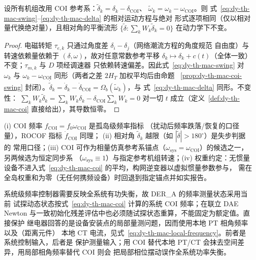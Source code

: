 \begin{proposition}[参考系平移不变性]\label{prop:dy-th-mac-shift}
设所有机组改用 COI 参考系：$\tilde\delta_k=\delta_k-\delta_{\mathrm{COI}}$、
$\tilde\omega_k=\omega_k-\omega_{\mathrm{COI}}$。则
式~\eqref{eq:dy-th-mac-swing}--\eqref{eq:dy-th-mac-delta} 的相对运动方程与绝对
形式逐项相同（仅以相对量代换绝对量），且相对角的平衡流形
$\{\tilde\delta:\sum_kW_k\tilde\delta_k=0\}$ 在动力学下不变。
\end{proposition}

\begin{proof}
电磁转矩 $\tau_{e,k}$ 只通过角度差 $\delta_i-\delta_j$（网络潮流方程的角度规范
自由度）与转速依赖量依赖于 $(\delta,\omega)$，故对任意常数参考平移
$\delta_k\mapsto\delta_k+c(t)$（全体一致）不变；$\tau_{m,k}$ 与 $D$ 项经调速器
只依赖转速偏差。因此式~\eqref{eq:dy-th-mac-swing} 对 $\omega_k$ 与
$\omega_k-\omega_{\mathrm{COI}}$ 同形（两者之差 $2H_T$ 加权平均后由命题
~\ref{prop:dy-th-mac-coi-swing} 封闭）。$\dot{\tilde\delta}_k
=\dot\delta_k-\dot\delta_{\mathrm{COI}}=\Omega_b(\tilde\omega_k)$，与
式~\eqref{eq:dy-th-mac-delta} 同形。不变性：
$\sum_kW_k\tilde\delta_k=\sum_kW_k\delta_k-\delta_{\mathrm{COI}}\sum_kW_k=0$
对一切 $t$ 成立（定义~\ref{def:dy-th-mac-coi} 直接给出），其导数恒零。
\end{proof}

\begin{remark}\label{rem:dy-th-mac-coi-use}
(i) COI 频率 $f_{\mathrm{COI}}=f_0\omega_{\mathrm{COI}}$ 是孤岛级频率指标
（扰动后频率跌落/恢复的口径量），ROCOF 指标 $\dot f_{\mathrm{COI}}$ 同理；
(ii) 相对角 $\tilde\delta_k$ 越限（如 $|\tilde\delta|>180^\circ$）是失步判据的
常用口径；(iii) COI 可作为相量仿真参考系锚点（$\omega_{\mathrm{sys}}=
\omega_{\mathrm{COI}}$）的候选之一，另两候选为恒定同步系
（$\omega_{\mathrm{sys}}\equiv1$）与指定参考机组转速；(iv) 权重约定：无惯量
设备不进入式~\eqref{eq:dy-th-mac-coi} 的平均，构网逆变器以虚拟惯量参数参与，
需在全岛权重和为零（无任何携频设备）时回退到指定锚点并如实报告。
\end{remark}

\begin{remark}[系统控制频率与本地保护频率不可混用]\label{rem:dy-th-mac-frequency-semantics}
系统级频率控制器需要反映全系统有功失衡，故 DER\_A 的频率测量状态采用当前
试探动态状态按式~\eqref{eq:dy-th-mac-coi} 计算的系统 COI 频率；在联立 DAE
Newton 与一致初始化残差评估中也必须随试探状态重算，不能固定为额定值。直接保护
继电器回答的是设备安装点的局部量测问题，因而使用本地 PT 相角频率以及（距离元件）
本地 CT 电流，见式~\eqref{eq:dy-th-mac-local-frequency}。前者是系统控制输入，后者是
保护测量输入；用 COI 替代本地 PT/CT 会抹去空间差异，用局部相角频率替代 COI 则会
把局部相位摆动误作全系统功率失衡。
\end{remark}


